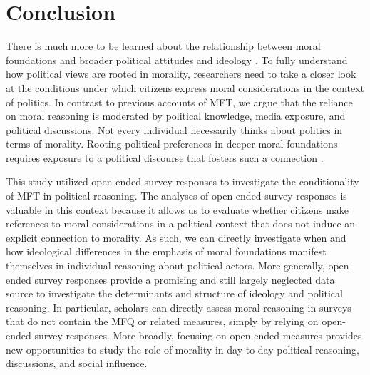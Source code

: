 \documentclass[12pt]{article}
\begin{document}
\section*{Conclusion}

There is much more to be learned about the relationship between moral foundations and broader political attitudes and ideology \citep[e.g.,][]{feldman2013political}. To fully understand how political views are rooted in morality, researchers need to take a closer look at the conditions under which citizens express moral considerations in the context of politics. In contrast to previous accounts of MFT, we argue that the reliance on moral reasoning is moderated by political knowledge, media exposure, and political discussions. Not every individual necessarily thinks about politics in terms of morality. Rooting political preferences in deeper moral foundations requires exposure to a political discourse that fosters such a connection \citep[c.f.,][]{clifford2015concerns}.

This study utilized open-ended survey responses to investigate the conditionality of MFT in political reasoning. The analyses of open-ended survey responses is valuable in this context because it allows us to evaluate whether citizens make references to moral considerations in a political context that does not induce an explicit connection to morality. As such, we can directly investigate when and how ideological differences in the emphasis of moral foundations manifest themselves in individual reasoning about political actors. More generally, open-ended survey responses provide a promising and still largely neglected data source to investigate the determinants and structure of ideology and political reasoning. In particular, scholars can directly assess moral reasoning in surveys that do not contain the MFQ or related measures, simply by relying on open-ended survey responses. More broadly, focusing on open-ended measures provides new opportunities to study the role of morality in day-to-day political reasoning, discussions, and social influence.
\end{document}
